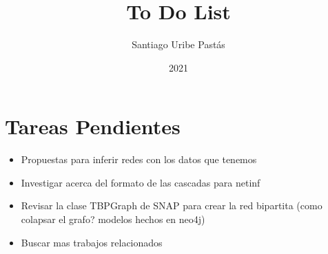 \documentclass{article}
\title{To Do List}
\author{Santiago Uribe Pastás}
\date{2021}
\begin{document}
\maketitle

\section{Tareas Pendientes}
\begin{itemize}
    \item Propuestas para inferir redes con los datos que tenemos
    \item Investigar acerca del formato de las cascadas para netinf
    \item Revisar la clase TBPGraph de SNAP para crear la red bipartita (como colapsar el grafo? modelos hechos en neo4j)
    \item Buscar mas trabajos relacionados
\end{itemize}
\end{document}
